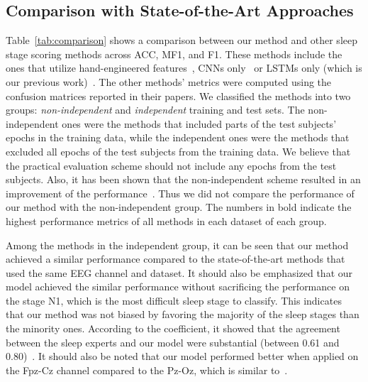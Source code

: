 \documentclass[journal,twoside]{IEEEtran}
\begin{document}
\subsection{Comparison with State-of-the-Art Approaches}
Table~\ref{tab:comparison} shows a comparison between our method and other sleep stage scoring methods across ACC, MF1,  and F1. These methods include the ones that utilize hand-engineered features~\cite{hsu2013,sharma2017,hassan2017,tsinalis2016}, CNNs only~\cite{tsinalis2016cnn} or LSTMs only (which is our previous work)~\cite{dong2016lstm}.
The other methods' metrics were computed using the confusion matrices reported in their papers. We classified the methods into two groups: \textit{non-independent} and \textit{independent} training and test sets. The non-independent ones were the methods that included parts of the test subjects' epochs in the training data, while the independent ones were the methods that excluded all epochs of the test subjects from the training data. We believe that the practical evaluation scheme should not include any epochs from the test subjects. Also, it has been shown that the non-independent scheme resulted in an improvement of the performance~\cite{tsinalis2016}. Thus we did not compare the performance of our method with the non-independent group. The numbers in bold indicate the highest performance metrics of all methods in each dataset of each group.


Among the methods in the independent group, it can be seen that our method achieved a similar performance compared to the state-of-the-art methods that used the same EEG channel and dataset. It should also be emphasized that our model achieved the similar performance without sacrificing the performance on the stage N1, which is the most difficult sleep stage to classify. This indicates that our method was not biased by favoring the majority of the sleep stages than the minority ones. According to the  coefficient, it showed that the agreement between the sleep experts and our model were substantial (between 0.61 and 0.80)~\cite{hassan2017}. It should also be noted that our model performed better when applied on the Fpz-Cz channel compared to the Pz-Oz, which is similar to~\cite{tsinalis2016}.
\end{document}
